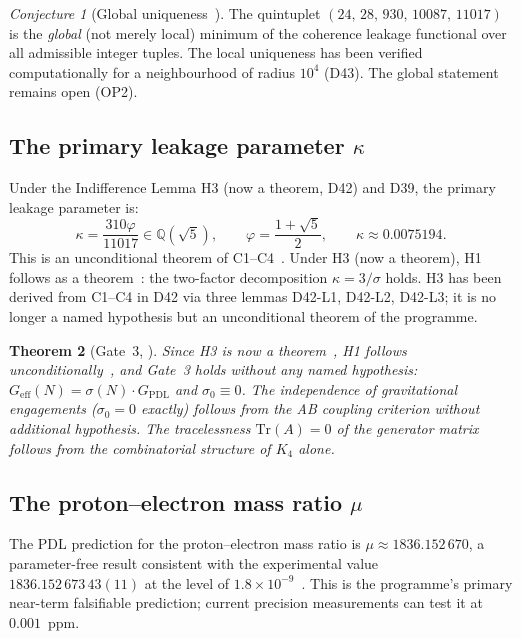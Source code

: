 \documentclass[11pt,a4paper]{article}
\theoremstyle{plain}
\newtheorem{theorem}{Theorem}[section]
\theoremstyle{definition}
\theoremstyle{remark}
\newtheorem{conjecture}[theorem]{Conjecture}
\newcommand{\quintuplet}{(24,\,28,\,930,\,10087,\,11017)}
\newcommand{\Geff}{G_{\mathrm{eff}}}
\newcommand{\GPDL}{G_{\mathrm{PDL}}}
\newcommand{\sigmaN}{\sigma(N)}
\begin{document}
\begin{conjecture}[Global uniqueness~\cite{D16,D16b}]
\label{conj:uniqueness}
The quintuplet $\quintuplet$ is the \emph{global} (not merely local) minimum of the coherence leakage functional over all admissible integer tuples. The local uniqueness has been verified computationally for a neighbourhood of radius $10^4$ (D43). The global statement remains open (OP2).
\end{conjecture}

\subsection{The primary leakage parameter \texorpdfstring{$\kappa$}{kappa}}
\label{subsec:kappa}
Under the Indifference Lemma H3 (now a theorem, D42) and D39, the primary leakage parameter is:
\begin{equation}
\kappa = \frac{310\varphi}{11017} \in \mathbb{Q}(\sqrt{5}), \qquad \varphi = \frac{1+\sqrt{5}}{2}, \qquad \kappa \approx 0.0075194.
\end{equation}
This is an unconditional theorem of C1--C4~\cite{D39,D42}. Under H3 (now a theorem), H1 follows as a theorem~\cite{D39}: the two-factor decomposition $\kappa=3/\sigma$ holds. H3 has been derived from C1--C4 in D42 via three lemmas D42-L1, D42-L2, D42-L3; it is no longer a named hypothesis but an unconditional theorem of the programme.

\begin{theorem}[Gate~3, \cite{D36}]
\label{thm:Gate3}
Since H3 is now a theorem~\cite{D42}, H1 follows unconditionally~\cite{D39}, and Gate~3 holds without any named hypothesis: $\Geff(N)=\sigmaN\cdot\GPDL$ and $\sigma_0\equiv 0$. The independence of gravitational engagements ($\sigma_0=0$ exactly) follows from the AB coupling criterion without additional hypothesis. The tracelessness $\mathrm{Tr}(A)=0$ of the generator matrix follows from the combinatorial structure of $K_4$ alone.
\end{theorem}

\subsection{The proton--electron mass ratio \texorpdfstring{$\mu$}{mu}}
\label{subsec:mu}
The PDL prediction for the proton--electron mass ratio is $\mu\approx 1836.152\,670$, a parameter-free result consistent with the experimental value $1836.152\,673\,43(11)$ at the level of $1.8\times10^{-9}$~\cite{D28,D29,D30}. This is the programme's primary near-term falsifiable prediction; current precision measurements can test it at $0.001$~ppm.
\end{document}
